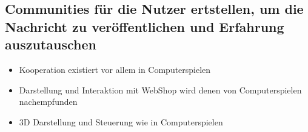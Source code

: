 \subsection{Communities  für die Nutzer ertstellen, um die Nachricht zu veröffentlichen und Erfahrung auszutauschen}

\begin{itemize}
\item Kooperation existiert vor allem in Computerspielen
\item Darstellung und Interaktion mit WebShop wird denen von Computerspielen nachempfunden
\item 3D Darstellung und Steuerung wie in Computerspielen
\end{itemize}